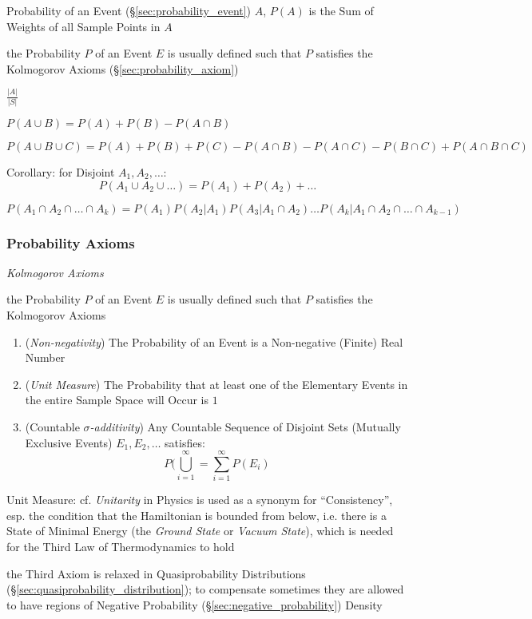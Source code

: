 Probability of an Event (\S\ref{sec:probability_event}) $A$, $P(A)$ is the Sum
of Weights of all Sample Points in $A$

the Probability $P$ of an Event $E$ is usually defined such that $P$ satisfies
the Kolmogorov Axioms (\S\ref{sec:probability_axiom})

$\frac{|A|}{|S|}$

$P(A \cup B) = P(A) + P(B) - P(A \cap B)$

$P(A \cup B \cup C) = P(A) + P(B) + P(C) - P(A \cap B) - P(A \cap C) -
P(B \cap C) + P(A \cap B \cap C)$

Corollary: for Disjoint $A_1, A_2, \ldots$:
\[
  P(A_1 \cup A_2 \cup \ldots) = P(A_1) + P(A_2) + \ldots
\]

$P(A_1 \cap A_2 \cap \ldots \cap A_k) = P(A_1) P(A_2 | A_1) P(A_3 |
A_1 \cap A_2) \ldots P(A_k | A_1 \cap A_2 \cap \ldots \cap A_{k-1})$



\subsubsection{Probability Axioms}\label{sec:probability_axioms}

\emph{Kolmogorov Axioms}

the Probability $P$ of an Event $E$ is usually defined such that $P$ satisfies
the Kolmogorov Axioms

\begin{enumerate}
  \item (\emph{Non-negativity}) The Probability of an Event is a Non-negative
    (Finite) Real Number
  \item (\emph{Unit Measure}) The Probability that at least one of the
    Elementary Events in the entire Sample Space will Occur is $1$
  \item (Countable \emph{$\sigma$-additivity}) Any Countable Sequence of
    Disjoint Sets (Mutually Exclusive Events) $E_1, E_2, \ldots$ satisfies:
    \[
      P (\bigcup_{i=1}^\infty = \sum_{i=1}^\infty P(E_i)
    \]
\end{enumerate}

\fist Unit Measure: cf. \emph{Unitarity} in Physics is used as a synonym for
``Consistency'', esp. the condition that the Hamiltonian is bounded from below,
i.e. there is a State of Minimal Energy (the \emph{Ground State} or
\emph{Vacuum State}), which is needed for the Third Law of Thermodynamics to
hold

the Third Axiom is relaxed in Quasiprobability Distributions
(\S\ref{sec:quasiprobability_distribution}); to compensate sometimes they are
allowed to have regions of Negative Probability
(\S\ref{sec:negative_probability}) Density

